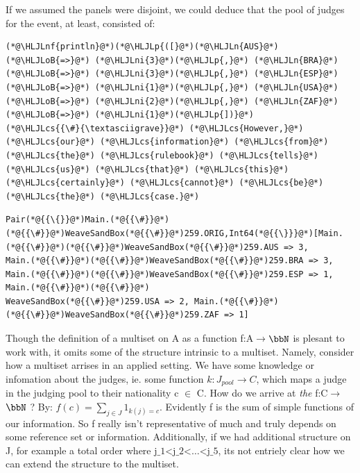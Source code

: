 \documentclass[12pt,a4paper]{article}
\newcommand{\HLJLn}[1]{#1}
\newcommand{\HLJLnf}[1]{\textcolor[RGB]{66,102,213}{#1}}
\newcommand{\HLJLni}[1]{\textcolor[RGB]{59,151,46}{#1}}
\newcommand{\HLJLoB}[1]{\textcolor[RGB]{102,102,102}{\textbf{#1}}}
\newcommand{\HLJLp}[1]{#1}
\newcommand{\HLJLcs}[1]{\textcolor[RGB]{153,153,119}{\textit{#1}}}
\begin{document}
If we assumed the panels were disjoint, we could deduce that the pool of judges for the event, at least, consisted of:


\begin{lstlisting}
(*@\HLJLnf{println}@*)(*@\HLJLp{([}@*)(*@\HLJLn{AUS}@*) (*@\HLJLoB{=>}@*) (*@\HLJLni{3}@*)(*@\HLJLp{,}@*) (*@\HLJLn{BRA}@*) (*@\HLJLoB{=>}@*) (*@\HLJLni{3}@*)(*@\HLJLp{,}@*) (*@\HLJLn{ESP}@*) (*@\HLJLoB{=>}@*) (*@\HLJLni{1}@*)(*@\HLJLp{,}@*) (*@\HLJLn{USA}@*) (*@\HLJLoB{=>}@*) (*@\HLJLni{2}@*)(*@\HLJLp{,}@*) (*@\HLJLn{ZAF}@*) (*@\HLJLoB{=>}@*) (*@\HLJLni{1}@*)(*@\HLJLp{])}@*)
(*@\HLJLcs{{\#}{\textasciigrave}}@*) (*@\HLJLcs{However,}@*) (*@\HLJLcs{our}@*) (*@\HLJLcs{information}@*) (*@\HLJLcs{from}@*) (*@\HLJLcs{the}@*) (*@\HLJLcs{rulebook}@*) (*@\HLJLcs{tells}@*) (*@\HLJLcs{us}@*) (*@\HLJLcs{that}@*) (*@\HLJLcs{this}@*) (*@\HLJLcs{certainly}@*) (*@\HLJLcs{cannot}@*) (*@\HLJLcs{be}@*) (*@\HLJLcs{the}@*) (*@\HLJLcs{case.}@*)
\end{lstlisting}

\begin{lstlisting}
Pair(*@{{\{}}@*)Main.(*@{{\#}}@*)(*@{{\#}}@*)WeaveSandBox(*@{{\#}}@*)259.ORIG,Int64(*@{{\}}}@*)[Main.(*@{{\#}}@*)(*@{{\#}}@*)WeaveSandBox(*@{{\#}}@*)259.AUS => 3, 
Main.(*@{{\#}}@*)(*@{{\#}}@*)WeaveSandBox(*@{{\#}}@*)259.BRA => 3, Main.(*@{{\#}}@*)(*@{{\#}}@*)WeaveSandBox(*@{{\#}}@*)259.ESP => 1, Main.(*@{{\#}}@*)(*@{{\#}}@*)
WeaveSandBox(*@{{\#}}@*)259.USA => 2, Main.(*@{{\#}}@*)(*@{{\#}}@*)WeaveSandBox(*@{{\#}}@*)259.ZAF => 1]
\end{lstlisting}


Though the definition of a multiset on A as a function f:A\ensuremath{\rightarrow}\ensuremath{\bbN} is plesant to work with, it omits some of the structure intrinsic to a multiset. Namely, consider how a multiset arrises in an applied setting. We have some knowledge or infomation about the judges, ie. some function $k: J_{pool} \ensuremath{\rightarrow} C$, which maps a judge in the judging pool to their nationality c \ensuremath{\in} C. How do we arrive at \emph{the} f:C\ensuremath{\rightarrow}\ensuremath{\bbN} ? By: $f(c) = \ensuremath{\sum}_{j \ensuremath{\in} J} 1_{k(j)=c }$. Evidently f is the sum of simple functions of our information. So f really isn't representative of much and truly depends on some reference set or information. Additionally, if we had additional structure on J, for example a total order where j\ensuremath{\_1}<j\ensuremath{\_2}<\ensuremath{\ldots}<j\ensuremath{\_5}, its not entriely clear how we can extend the structure to the multiset.
\end{document}
